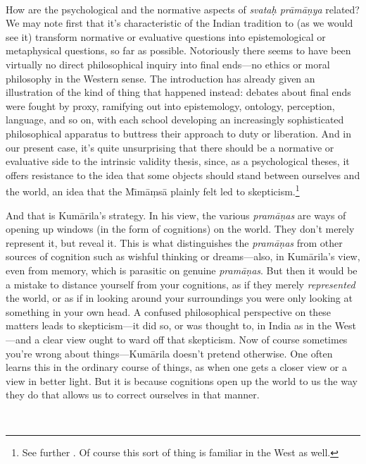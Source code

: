 ﻿\documentclass[11pt]{amsart}
\begin{document}
\

How are the psychological and the normative aspects of \emph{svata\d h pr\=am\=a\d nya} related? We may note first that it's characteristic of the Indian tradition to (as we would see it) transform normative or evaluative questions into epistemological or metaphysical questions, so far as possible. Notoriously there seems to have been virtually no direct philosophical inquiry into final ends---no ethics or moral philosophy in the Western sense. The introduction has already given an illustration of the kind of thing that happened instead: debates about final ends were fought by proxy, ramifying out into epistemology, ontology, perception, language, and so on, with each school developing an increasingly sophisticated philosophical apparatus to buttress their approach to duty or liberation. And in our present case, it's quite unsurprising that there should be a normative or evaluative side to the intrinsic validity thesis, since, as a psychological theses, it offers resistance to the idea that some objects should stand between ourselves and the world, an idea that the M\={\i}m\=a\d ms\=a plainly felt led to skepticism.\footnote{See further \citet{sen1984concept}. Of course this sort of thing is familiar in the West as well.} 

And that is Kum\=arila's strategy. In his view, the various \emph{pram\=a\d nas} are ways of opening up windows (in the form of cognitions) on the world. They don't merely represent it, but reveal it. This is what distinguishes the \emph{pram\=a\d nas} from other sources of cognition such as wishful thinking or dreams---also, in Kum\=arila's view, even from memory, which is parasitic on genuine \emph{pram\=a\d nas}. But then it would be a mistake to distance yourself from your cognitions, as if they merely \emph{represented} the world, or as if in looking around your surroundings you were only looking at something in your own head. A confused philosophical perspective on these matters leads to skepticism---it did so, or was thought to, in India as in the West---and a clear view ought to ward off that skepticism. Now of course sometimes you're wrong about things---Kum\=arila doesn't pretend otherwise. One often learns this in the ordinary course of things, as when one gets a closer view or a view in better light. But it is because cognitions open up the world to us the way they do that allows us to correct ourselves in that manner.

\
\end{document}
